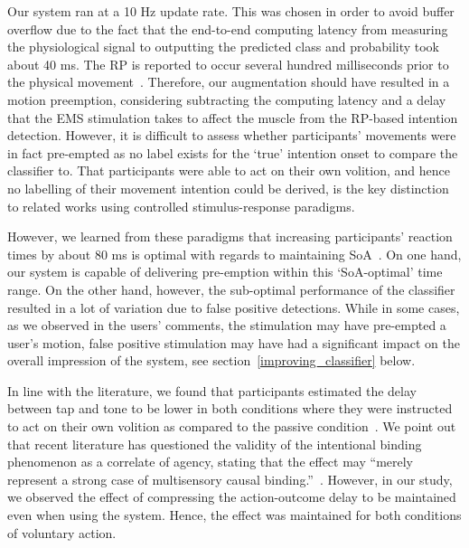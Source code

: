Our system ran at a 10 Hz update rate. This was chosen in order to avoid buffer overflow due to the fact that the end-to-end computing latency from measuring the physiological signal to outputting the predicted class and probability took about 40 ms. The RP is reported to occur several hundred milliseconds prior to the physical movement~\cite{Schurger2021-vp}. Therefore, our augmentation should have resulted in a motion preemption, considering subtracting the computing latency and a delay that the EMS stimulation takes to affect the muscle from the RP-based intention detection. However, it is difficult to assess whether participants' movements were in fact pre-empted as no label exists for the `true' intention onset to compare the classifier to. That participants were able to act on their own volition, and hence no labelling of their movement intention could be derived, is the key distinction to related works using controlled stimulus-response paradigms.

However, we learned from these paradigms that increasing participants' reaction times by about 80 ms is optimal with regards to maintaining SoA~\cite{Kasahara2019-sk}. On one hand, our system is capable of delivering pre-emption within this `SoA-optimal' time range. On the other hand, however, the sub-optimal performance of the classifier resulted in a lot of variation due to false positive detections. While in some cases, as we observed in the users' comments, the stimulation may have pre-empted a user's motion, false positive stimulation may have had a significant impact on the overall impression of the system, see section~\ref{improving_classifier} below.

In line with the literature, we found that participants estimated the delay between tap and tone to be lower in both conditions where they were instructed to act on their own volition as compared to the passive condition~\cite{Moore2012-dk}. We point out that recent literature has questioned the validity of the intentional binding phenomenon as a correlate of agency, stating that the effect may ``merely represent a strong case of multisensory causal binding.''~\cite{Suzuki2019-pi, Gutzeit2023-ei, Hoerl2020-my}. However, in our study, we observed the effect of compressing the action-outcome delay to be maintained even when using the system. Hence, the effect was maintained for both conditions of voluntary action.

